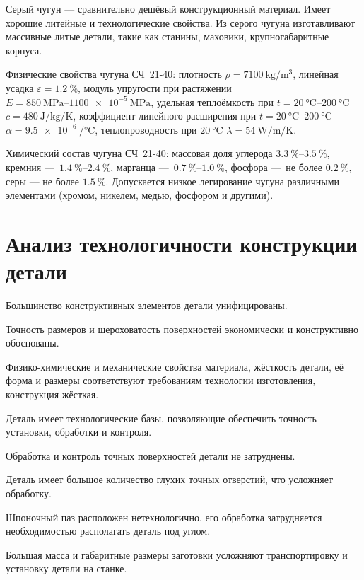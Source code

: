 \documentclass[14pt,russian,a4paper]{extreport}
\begin{document}
Серый чугун --- сравнительно дешёвый конструкционный материал. Имеет хорошие литейные и технологические свойства. Из серого чугуна изготавливают массивные литые детали, такие как станины, маховики, крупногабаритные корпуса. \par

Физические свойства чугуна СЧ~21-40: плотность $\rho = \SI{7100}{\kilo\gram\per\meter\cubed}$, линейная усадка $\varepsilon = \SI{1,2}{\percent}$, модуль упругости при растяжении $E = \SIrange[allow-number-unit-breaks]{850}{1100e-5}{\mega\pascal}$, удельная теплоёмкость при $t = \SIrange{20}{200}{\celsius}$ $c = \SI{480}{\joule\per\kilo\gram\per\kelvin}$, коэффициент линейного расширения при $t = \SIrange{20}{200}{\celsius}$ $\alpha = \SI[per-mode=reciprocal]{9,5e-6}{\per\celsius}$, теплопроводность при $\SI{20}{\celsius}$ $\lambda = \SI{54}{\watt\per\meter\per\kelvin}$. \par

Химический состав чугуна СЧ~21-40: массовая доля углерода $\SIrange{3,3}{3,5}{\percent}$, кремния --- $\SIrange{1,4}{2,4}{\percent}$, марганца --- $\SIrange{0,7}{1,0}{\percent}$, фосфора --- не более $\SI{0,2}{\percent}$, серы --- не более $\SI{1,5}{\percent}$. Допускается низкое легирование чугуна различными элементами (хромом, никелем, медью, фосфором и другими).


\section{Анализ технологичности конструкции детали}

Большинство конструктивных элементов детали унифицированы. 

Точность размеров и шероховатость поверхностей экономически и конструктивно обоснованы. 

Физико-химические и механические свойства материала, жёсткость детали, её форма и размеры соответствуют требованиям технологии изготовления, конструкция жёсткая.

Деталь имеет технологические базы, позволяющие обеспечить точность установки, обработки и контроля.

Обработка и контроль точных поверхностей детали не затруднены.

Деталь имеет большое количество глухих точных отверстий, что усложняет обработку.

Шпоночный паз расположен нетехнологично, его обработка затрудняется необходимостью располагать деталь под углом.

Большая масса и габаритные размеры заготовки усложняют транспортировку и установку детали на станке.
\end{document}
